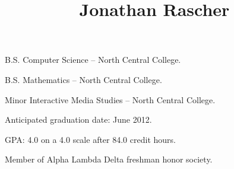 \documentclass[11pt]{simplecv}
\begin{document}
  \leftheader{
    \contactemail \\
    \contactphone
  }

  \rightheader{
    \contactaddressone \\
    \contactaddresstwo
  }

  \title{Jonathan Rascher}
  \maketitle

  \begin{topic}
    \item[B.S.] Computer Science -- North Central College.

    \item[B.S.] Mathematics -- North Central College.

    \item[Minor] Interactive Media Studies -- North Central College.

    \item Anticipated graduation date: June 2012.

    \item GPA: 4.0 on a 4.0 scale after 84.0 credit hours.

    \item Member of Alpha Lambda Delta freshman honor society.
  \end{topic}
\end{document}
